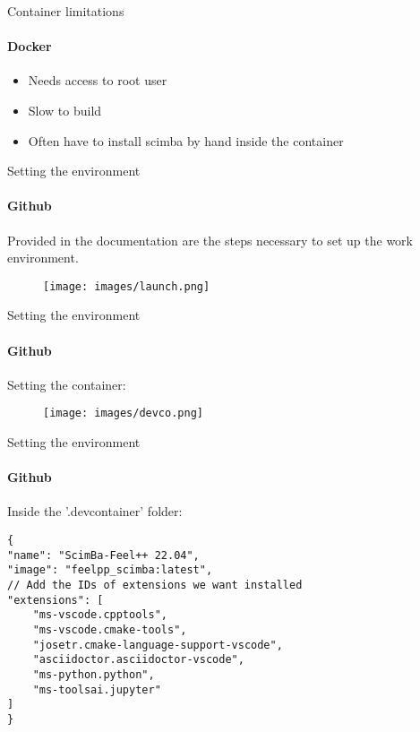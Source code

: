 \documentclass{beamer}
\begin{document}
\begin{frame}{Container limitations}
\framesubtitle{Docker}

    \begin{itemize}
        \item Needs access to root user
        \item Slow to build
        \item Often have to install scimba by hand inside the container
    \end{itemize}
\end{frame}

\begin{frame}[plain]
\begin{center}
\end{center}

\end{frame}



\begin{frame}[fragile]{Setting the environment}
\framesubtitle{Github}
    
Provided in the documentation are the steps necessary to set up the work environment.
\begin{figure}
    \centering
    \texttt{[image: images/launch.png]} 
    \label{ReadMe file in the repository}
\end{figure}

\end{frame}


\begin{frame}[fragile]{Setting the environment}
\framesubtitle{Github}
Setting the container:
\begin{figure}
    \centering
    \texttt{[image: images/devco.png]} 
    \label{devcontainer}
\end{figure}

\end{frame}
\begin{frame}[fragile]{Setting the environment}
\framesubtitle{Github}
Inside the '.devcontainer' folder:
\begin{lstlisting}
{
"name": "ScimBa-Feel++ 22.04",
"image": "feelpp_scimba:latest",
// Add the IDs of extensions we want installed
"extensions": [
    "ms-vscode.cpptools",
    "ms-vscode.cmake-tools",
    "josetr.cmake-language-support-vscode",
    "asciidoctor.asciidoctor-vscode",
    "ms-python.python",
    "ms-toolsai.jupyter"
]
}

\end{lstlisting}

\end{frame}
\end{document}
